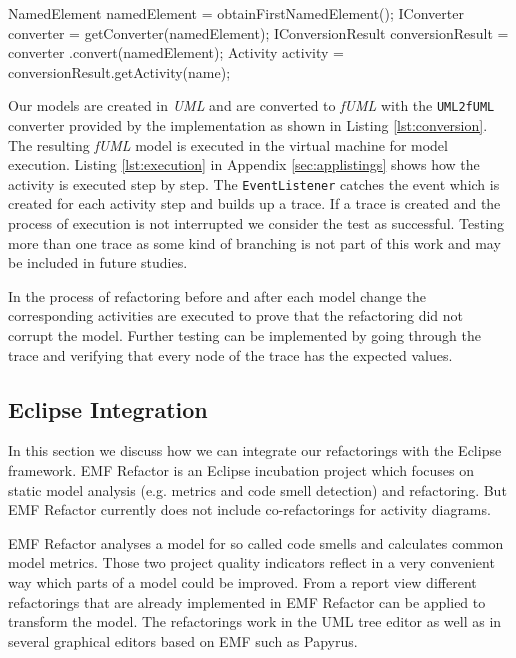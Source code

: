 \documentclass{llncs}
\begin{document}
\begin{lstsingle}[language=Java,caption=Converting the UML diagram to fUML,label=lst:conversion]
NamedElement namedElement = obtainFirstNamedElement();
IConverter converter = getConverter(namedElement);
IConversionResult conversionResult = converter
  .convert(namedElement);
Activity activity = conversionResult.getActivity(name);
\end{lstsingle}

Our models are created in \textit{UML} and are converted to \textit{fUML} with the \texttt{UML2fUML} converter 
provided by the implementation as shown in Listing \ref{lst:conversion}. The resulting \textit{fUML} model is executed in the 
virtual machine for model execution. Listing \ref{lst:execution} in Appendix \ref{sec:applistings} shows how the activity is executed step by step. The \texttt{EventListener} 
catches the event which is created for each activity step and builds up a trace. If a trace is created and the process of execution is not interrupted we consider the 
test as successful. Testing more than one trace as some kind of branching is not part of this work and may be included in future studies.

In the process of refactoring before and after each model change the corresponding activities are executed to prove that 
the refactoring did not corrupt the model.
Further testing can be implemented by going through the trace and verifying 
that every node of the trace has the expected values.

\subsection{Eclipse Integration}
\label{sec:guiintegration}
In this section we discuss how we can integrate our refactorings with the Eclipse framework. EMF Refactor is an Eclipse incubation 
project which focuses on static model analysis (e.g. metrics and code smell detection) and refactoring. But EMF Refactor currently
does not include co-refactorings for activity diagrams.

EMF Refactor analyses a model for so called code smells and calculates common model metrics. Those two project quality 
indicators reflect in a very convenient way which parts of a model could be improved. From a report view different 
refactorings that are already implemented in EMF Refactor can be applied to transform the model. The refactorings work in the UML tree 
editor as well as in several graphical editors based on EMF such as Papyrus.
\end{document}
